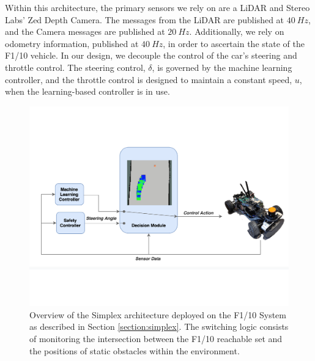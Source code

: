 \documentclass[manuscript,screen,review]{acmart}
\begin{document}
Within this architecture, the primary sensors we rely on are a LiDAR and Stereo Labs' Zed Depth Camera. The messages from the LiDAR are published at $40 \ Hz$, and the Camera messages are published at $20 \ Hz$. Additionally, we rely on odometry information, published at $40 \ Hz$, in order to ascertain the state of the F1/10 vehicle. In our design, we decouple the control of the car's steering and throttle control. The steering control, $\delta$, is governed by the machine learning controller, and the throttle control is designed to maintain a constant speed, $u$, when the learning-based controller is in use. 


\begin{figure}[htbp]%
  \centering
  \includegraphics[width=0.8\linewidth]{figures/simplex_real.pdf}
  \caption{Overview of the Simplex architecture deployed on the F1/10 System as described in Section \ref{section:simplex}. The switching logic consists of monitoring the intersection between the F1/10 reachable set and the positions of static obstacles within the environment.}
  \label{fig:simplex_arch}
\end{figure}%
\end{document}
